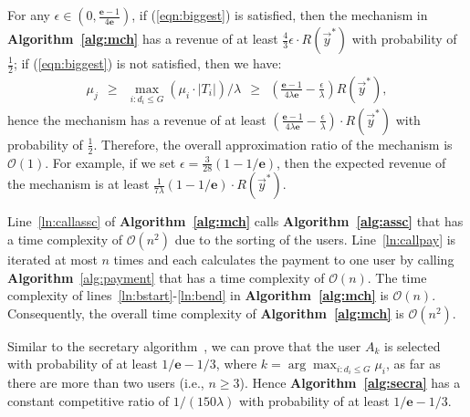 \documentclass[10pt,journal,compsoc]{IEEEtran}
\begin{document}
\begin{IEEEproof}
For any $\epsilon\in (0,\frac{\mathbf{e}-1}{4\mathbf{e}})$, if (\ref{eqn:biggest}) is satisfied, then the mechanism in \textbf{Algorithm~\ref{alg:mch}} has a revenue of at least $\frac{4}{3}\epsilon\cdot R(\vec{y}^*)$ with probability of $\frac{1}{2}$; if (\ref{eqn:biggest}) is not satisfied, then we have:
\begin{eqnarray}
    \mu_j~~\geq~~\max_{i:d_i\leq G} (\mu_i\cdot |T_i|)/\lambda~~\geq~~\left(\frac{\mathbf{e}-1}{4\lambda \mathbf{e}}-\frac{\epsilon}{\lambda}\right)R(\vec{y}^*), \nonumber
  \end{eqnarray}
hence the mechanism has a revenue of at least $\left(\frac{\mathbf{e}-1}{4\lambda \mathbf{e}}-\frac{\epsilon}{\lambda}\right)\cdot R(\vec{y}^*)$ with probability of $\frac{1}{2}$. Therefore, the overall approximation ratio of the mechanism is $\mathcal{O}(1)$. For example, if we set $\epsilon=\frac{3}{28}(1-1/\mathbf{e})$, then the expected revenue of the mechanism is at least $\frac{1}{7\lambda}(1-1/\mathbf{e})\cdot R(\vec{y}^*)$.
\end{IEEEproof}

\begin{IEEEproof}
Line~\ref{ln:callassc} of \textbf{Algorithm~\ref{alg:mch}} calls \textbf{Algorithm~\ref{alg:assc}} that has a time complexity of $\mathcal{O}(n^2)$ due to the sorting of the users. Line~\ref{ln:callpay} is iterated at most $n$ times and each calculates the payment to one user by calling \textbf{Algorithm}~\ref{alg:payment} that has a time complexity of $\mathcal{O}(n)$. The time complexity of lines~\ref{ln:bstart}-\ref{ln:bend} in \textbf{Algorithm~\ref{alg:mch}} is $\mathcal{O}(n)$.  Consequently, the overall time complexity of \textbf{Algorithm~\ref{alg:mch}} is $\mathcal{O}(n^2)$.
\end{IEEEproof}

\begin{IEEEproof} 
Similar to the secretary algorithm~\cite{Dynkin1963}, we can prove that the user $A_k$ is selected with probability of at least $1/\mathbf{e}-1/3$, where $k=\arg\max_{i:d_i\leq G}\mu_i$, as far as there are more than two users (i.e., $n \ge 3$). Hence \textbf{Algorithm~\ref{alg:secra}} has a constant competitive ratio of $1/(150\lambda)$ with probability of at least $1/\mathbf{e}-1/3$.
\end{IEEEproof}
\end{document}
